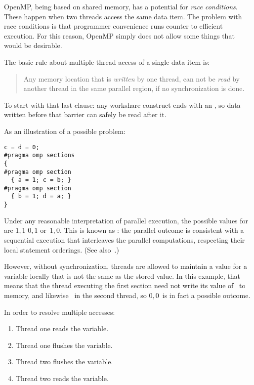OpenMP, being based on shared memory, has a potential for \emph{race
  conditions}. These happen when two threads access the same data
item. The problem with race conditions is that programmer convenience
runs counter to efficient execution. For this reason, OpenMP simply
does not allow some things that would be desirable.

The basic rule about multiple-thread access of a single data item is:
\begin{quote}
  Any memory location that is \emph{written} by one thread, can not be
  \emph{read} by another thread in the same parallel region, if no
  synchronization is done.
\end{quote}
To start with that last clause: any workshare construct ends with an
, so data written before that barrier
can safely be read after it.

As an illustration of a possible problem:
\begin{verbatim}
c = d = 0;
#pragma omp sections
{
#pragma omp section
  { a = 1; c = b; }
#pragma omp section
  { b = 1; d = a; }
}
\end{verbatim}
Under any reasonable interpretation of parallel execution,
the possible values for  are $1,1$ $0,1$ or~$1,0$.
This is known as :
the parallel outcome is consistent with a sequential execution that
interleaves the parallel computations, respecting their local statement orderings.
(See also~.)

However, without synchronization, threads are allowed to maintain a value for a
variable locally that is not the same as the stored value. In this
example, that means that the thread executing the first section need
not write its value of~ to memory, and likewise ~in the
second thread, so $0,0$~is in fact a possible outcome.

In order to resolve multiple accesses:
\begin{enumerate}
\item Thread one reads the variable.
\item Thread one flushes the variable.
\item Thread two flushes the variable.
\item Thread two reads the variable.
\end{enumerate}


